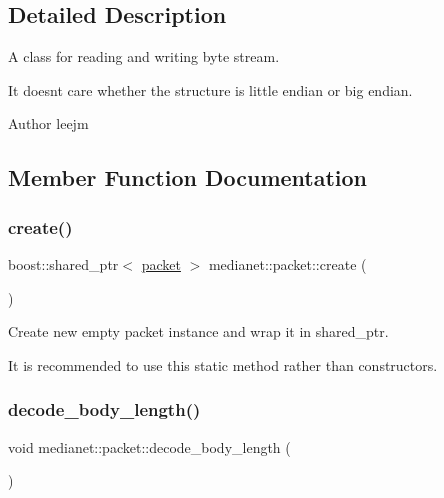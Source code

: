 \subsection{Detailed Description}
A class for reading and writing byte stream. 

It doesn\textquotesingle{}t care whether the structure is little endian or big endian.

\begin{DoxyAuthor}{Author}
leejm 
\end{DoxyAuthor}


\subsection{Member Function Documentation}
\mbox{\label{classmedianet_1_1packet_a294f37745cf25051ac7285481b701caa}} 
\subsubsection{\texorpdfstring{create()}{create()}}
{\footnotesize\ttfamily boost\+::shared\+\_\+ptr$<$ \mbox{\hyperlink{classmedianet_1_1packet}{packet}} $>$ medianet\+::packet\+::create (\begin{DoxyParamCaption}{ }\end{DoxyParamCaption})\hspace{0.3cm}{\ttfamily [static]}}



Create new empty packet instance and wrap it in shared\+\_\+ptr. 

It is recommended to use this static method rather than constructors. \mbox{\label{classmedianet_1_1packet_a5b32d695828820879740c26f036066f0}} 
\subsubsection{\texorpdfstring{decode\_body\_length()}{decode\_body\_length()}}
{\footnotesize\ttfamily void medianet\+::packet\+::decode\+\_\+body\+\_\+length (\begin{DoxyParamCaption}{ }\end{DoxyParamCaption})}


